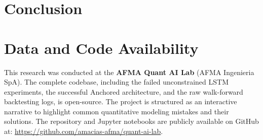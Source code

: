 \documentclass[12pt, a4paper]{article}
\begin{document}
\section{Conclusion}


\section*{Data and Code Availability}
This research was conducted at the \textbf{AFMA Quant AI Lab} (AFMA Ingenieria SpA). The complete codebase, including the failed unconstrained LSTM experiments, the successful Anchored architecture, and the raw walk-forward backtesting logs, is open-source. The project is structured as an interactive narrative to highlight common quantitative modeling mistakes and their solutions. The repository and Jupyter notebooks are publicly available on GitHub at: \url{https://github.com/amacias-afma/quant-ai-lab}.



\end{document}
